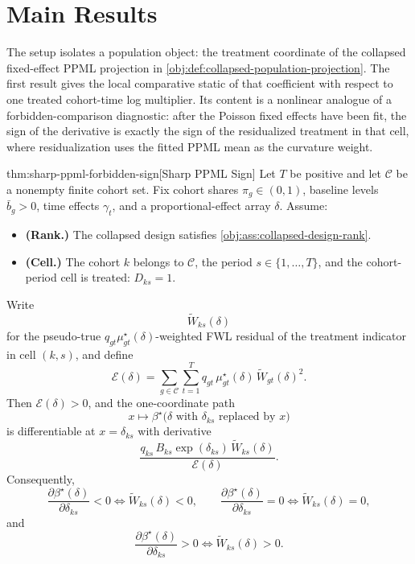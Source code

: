 \section{Main Results}

The setup isolates a population object: the treatment coordinate of the collapsed fixed-effect PPML projection in \cref{obj:def:collapsed-population-projection}. The first result gives the local comparative static of that coefficient with respect to one treated cohort-time log multiplier. Its content is a nonlinear analogue of a forbidden-comparison diagnostic: after the Poisson fixed effects have been fit, the sign of the derivative is exactly the sign of the residualized treatment in that cell, where residualization uses the fitted PPML mean as the curvature weight.

\begin{theoremv}{thm:sharp-ppml-forbidden-sign}[Sharp PPML Sign]
Let \(T\) be positive and let \(\mathcal C\) be a nonempty finite cohort set. Fix cohort shares \(\pi_g\in(0,1)\), baseline levels \(\bar b_g>0\), time effects \(\gamma_t\), and a proportional-effect array \(\delta\). Assume:
\begin{itemize}
\item \textbf{(Rank.)} The collapsed design satisfies \cref{obj:ass:collapsed-design-rank}.
\item \textbf{(Cell.)} The cohort \(k\) belongs to \(\mathcal C\), the period \(s\in\{1,\ldots,T\}\), and the cohort-period cell is treated: \(D_{ks}=1\).
\end{itemize}
Write
\[
\widetilde W_{ks}(\delta)
\]
for the pseudo-true \(q_{gt}\mu^\star_{gt}(\delta)\)-weighted FWL residual of the treatment indicator in cell \((k,s)\), and define
\[
\mathcal E(\delta)
=
\sum_{g\in\mathcal C}\sum_{t=1}^T
q_{gt}\,\mu^\star_{gt}(\delta)\,
\widetilde W_{gt}(\delta)^2 .
\]
Then \(\mathcal E(\delta)>0\), and the one-coordinate path
\[
x\mapsto \beta^\star\!\bigl(\delta \text{ with } \delta_{ks}\text{ replaced by }x\bigr)
\]
is differentiable at \(x=\delta_{ks}\) with derivative
\[
\frac{
q_{ks}\,B_{ks}\exp(\delta_{ks})\,\widetilde W_{ks}(\delta)
}{
\mathcal E(\delta)
}.
\]
Consequently,
\[
\frac{\partial \beta^\star(\delta)}{\partial \delta_{ks}}<0
\iff
\widetilde W_{ks}(\delta)<0,\qquad
\frac{\partial \beta^\star(\delta)}{\partial \delta_{ks}}=0
\iff
\widetilde W_{ks}(\delta)=0,
\]
and
\[
\frac{\partial \beta^\star(\delta)}{\partial \delta_{ks}}>0
\iff
\widetilde W_{ks}(\delta)>0.
\]
\end{theoremv}

